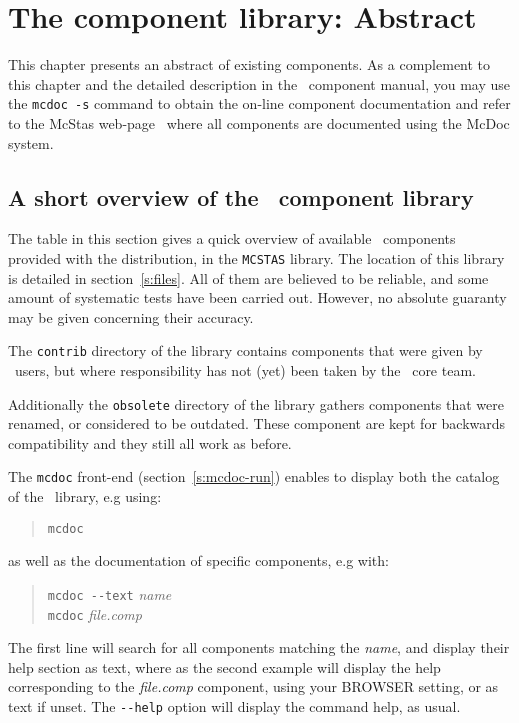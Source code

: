 \chapter{The component library: Abstract}
\label{s:components}

This chapter presents an abstract of existing components. 
As a complement to this chapter and the
detailed description in the \MCS\ component manual, 
you may use the \verb+mcdoc -s+ command to obtain the on-line 
component documentation and refer to the McStas web-page~\cite{mcstas_webpage} 
where all components are documented using the McDoc system.

\section{A short overview of the \MCS\ component library}
\label{s:comp-overview}

The table in this section gives a quick overview of available \MCS\ components
provided with the distribution, in the \verb+MCSTAS+ library. The
location of this library is detailed in section~\ref{s:files}. 
All of them are believed to be reliable, and some amount of systematic
tests have been carried out. 
However, no absolute guaranty may be given concerning their accuracy.

The \verb+contrib+ directory of the library contains components 
that were given by \MCS\ users, 
but where responsibility has not (yet) been taken by the \MCS\ core team. 

Additionally the \verb+obsolete+ directory of the library gathers components that were renamed, or considered to be outdated. 
These component are kept for backwards compatibility and 
they still all work as before.

The \verb+mcdoc+ front-end (section~\ref{s:mcdoc-run}) enables to display both the
catalog of the \MCS\ library, e.g using: 
\begin{quote}
  \verb|mcdoc|
\end{quote}
as well as the documentation of specific components, e.g with:
\begin{quote}
  \verb|mcdoc --text| {\it name} \\
  \verb|mcdoc| {\it file.comp}
\end{quote}
The first line will search for all components matching the {\it name}, and display their help section as text, where as the second example will display the help corresponding to the {\it file.comp} component, using your BROWSER setting, or as text if unset. The \verb+--help+ option will display the command help, as usual.

